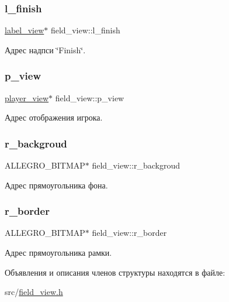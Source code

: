 \subsubsection{\texorpdfstring{l\+\_\+finish}{l\_finish}}
{\footnotesize\ttfamily \hyperlink{structlabel__view}{label\+\_\+view}$\ast$ field\+\_\+view\+::l\+\_\+finish}



Адрес надпси \char`\"{}\+Finish\char`\"{}. 

\mbox{\label{structfield__view_ab3016ab1d95a4391f499cb754981d783}} 
\subsubsection{\texorpdfstring{p\+\_\+view}{p\_view}}
{\footnotesize\ttfamily \hyperlink{structplayer__view}{player\+\_\+view}$\ast$ field\+\_\+view\+::p\+\_\+view}



Адрес отображения игрока. 

\mbox{\label{structfield__view_ab53c9a1f28f08baf51ad715a0959d7bd}} 
\subsubsection{\texorpdfstring{r\+\_\+backgroud}{r\_backgroud}}
{\footnotesize\ttfamily A\+L\+L\+E\+G\+R\+O\+\_\+\+B\+I\+T\+M\+AP$\ast$ field\+\_\+view\+::r\+\_\+backgroud}



Адрес прямоугольника фона. 

\mbox{\label{structfield__view_a55858cc4e1caeeea539ff16ddd1baa79}} 
\subsubsection{\texorpdfstring{r\+\_\+border}{r\_border}}
{\footnotesize\ttfamily A\+L\+L\+E\+G\+R\+O\+\_\+\+B\+I\+T\+M\+AP$\ast$ field\+\_\+view\+::r\+\_\+border}



Адрес прямоугольника рамки. 



Объявления и описания членов структуры находятся в файле\+:\begin{DoxyCompactItemize}
\item 
src/\hyperlink{field__view_8h}{field\+\_\+view.\+h}\end{DoxyCompactItemize}
